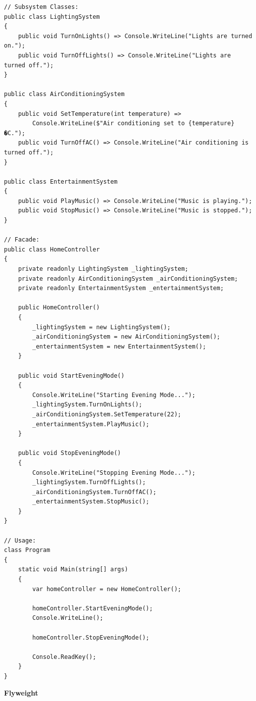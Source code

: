 \begin{lstlisting}
// Subsystem Classes:
public class LightingSystem
{
    public void TurnOnLights() => Console.WriteLine("Lights are turned on.");
    public void TurnOffLights() => Console.WriteLine("Lights are turned off.");
}

public class AirConditioningSystem
{
    public void SetTemperature(int temperature) =>
        Console.WriteLine($"Air conditioning set to {temperature}�C.");
    public void TurnOffAC() => Console.WriteLine("Air conditioning is turned off.");
}

public class EntertainmentSystem
{
    public void PlayMusic() => Console.WriteLine("Music is playing.");
    public void StopMusic() => Console.WriteLine("Music is stopped.");
}

// Facade:
public class HomeController
{
    private readonly LightingSystem _lightingSystem;
    private readonly AirConditioningSystem _airConditioningSystem;
    private readonly EntertainmentSystem _entertainmentSystem;

    public HomeController()
    {
        _lightingSystem = new LightingSystem();
        _airConditioningSystem = new AirConditioningSystem();
        _entertainmentSystem = new EntertainmentSystem();
    }

    public void StartEveningMode()
    {
        Console.WriteLine("Starting Evening Mode...");
        _lightingSystem.TurnOnLights();
        _airConditioningSystem.SetTemperature(22);
        _entertainmentSystem.PlayMusic();
    }

    public void StopEveningMode()
    {
        Console.WriteLine("Stopping Evening Mode...");
        _lightingSystem.TurnOffLights();
        _airConditioningSystem.TurnOffAC();
        _entertainmentSystem.StopMusic();
    }
}

// Usage:
class Program
{
    static void Main(string[] args)
    {
        var homeController = new HomeController();

        homeController.StartEveningMode();
        Console.WriteLine();

        homeController.StopEveningMode();

        Console.ReadKey();
    }
}

\end{lstlisting}






\medskip
\begin{center}
\textbf{Flyweight}
\end{center}

